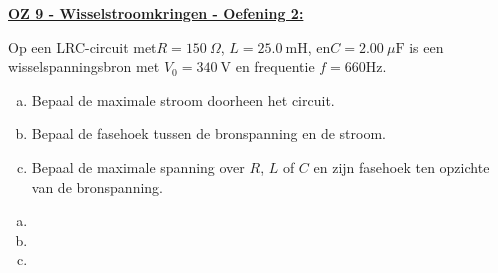 \textbf{\underline{OZ 9 - Wisselstroomkringen - Oefening 2:}}
\vspace{0.5cm}

Op een LRC-circuit met$ R = 150 \ \Omega$, $L = 25.0 \ \text{mH}$, en$ C = 2.00 \ \mu\text{F}$ is een wisselspanningsbron met $V_0 = 340 \ \text{V}$ en frequentie $f = 660 \text{Hz}$.

\begin{enumerate}[(a)]
    \item Bepaal de maximale stroom doorheen het circuit.
    \item Bepaal de fasehoek tussen de bronspanning en de stroom.
    \item Bepaal de maximale spanning over $R$, $L$ of $C$ en zijn fasehoek ten opzichte van de bronspanning.
\end{enumerate}

\begin{enumerate}[(a)]
    \item 
        \begin{description}[labelwidth=1.5cm, leftmargin=!]
            \item[Geg. :]   
            \item[Gevr. :] 
            \item[Opl. :]   
        \end{description}
    \item
        \begin{description}[labelwidth=1.5cm, leftmargin=!]
            \item[Geg. :]   
            \item[Gevr. :] 
            \item[Opl. :]   
        \end{description}
    \item
        \begin{description}[labelwidth=1.5cm, leftmargin=!]
            \item[Geg. :]   
            \item[Gevr. :] 
            \item[Opl. :]   
        \end{description}
\end{enumerate}

\vspace{1cm}
